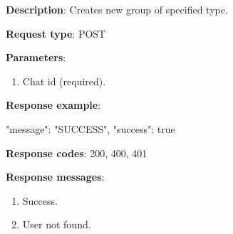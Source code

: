 \begin{itemize}
    \textbf{Description}: Creates new group of specified type.

    \textbf{Request type}: POST

    \textbf{Parameters}:

    \begin{enumerate}
        \item Chat id (required).
    \end{enumerate}

    \textbf{Response example}:

    \begin{spverbatim}
    {
        "message": "SUCCESS",
        "success": true
    }
    \end{spverbatim}

    \textbf{Response codes}: 200, 400, 401

    \textbf{Response messages}:
    \begin{enumerate}
        \item Success.
        \item User not found.
    \end{enumerate}
\end{itemize}

